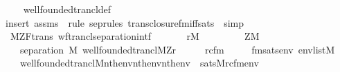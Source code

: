 \begin{isabellebody}
%
\isadelimproof
\ \ %
\endisadelimproof
%
\isatagproof
{}\isamarkupfalse%
\ \ wellfounded{\isacharunderscore}{\kern0pt}trancl{\isacharunderscore}{\kern0pt}def\isanewline
\ \ \isamarkupfalse%
\ {\isacharparenleft}{\kern0pt}insert\ assms\ {\isacharsemicolon}{\kern0pt}\ {\isacharparenleft}{\kern0pt}rule\ sep{\isacharunderscore}{\kern0pt}rules\ trans{\isacharunderscore}{\kern0pt}closure{\isacharunderscore}{\kern0pt}fm{\isacharunderscore}{\kern0pt}iff{\isacharunderscore}{\kern0pt}sats\ {\isacharbar}{\kern0pt}\ simp{\isacharparenright}{\kern0pt}{\isacharplus}{\kern0pt}{\isacharparenright}{\kern0pt}%
\endisatagproof
{\isafoldproof}%
%
\isadelimproof
\isanewline
%
\endisadelimproof
\isanewline
{}\isamarkupfalse%
\ {\isacharparenleft}{\kern0pt}\ M{\isacharunderscore}{\kern0pt}ZF{\isacharunderscore}{\kern0pt}trans{\isacharparenright}{\kern0pt}\ wftrancl{\isacharunderscore}{\kern0pt}separation{\isacharunderscore}{\kern0pt}intf{\isacharcolon}{\kern0pt}\isanewline
\ \ \isanewline
\ \ \ \ {\isachardoublequoteopen}r{\isasymin}M{\isachardoublequoteclose}\isanewline
\ \ \ \ \isanewline
\ \ \ \ {\isachardoublequoteopen}Z{\isasymin}M{\isachardoublequoteclose}\isanewline
\ \ \isanewline
\ \ \ \ {\isachardoublequoteopen}separation\ {\isacharparenleft}{\kern0pt}{\isacharhash}{\kern0pt}{\isacharhash}{\kern0pt}M{\isacharcomma}{\kern0pt}\ wellfounded{\isacharunderscore}{\kern0pt}trancl{\isacharparenleft}{\kern0pt}{\isacharhash}{\kern0pt}{\isacharhash}{\kern0pt}M{\isacharcomma}{\kern0pt}Z{\isacharcomma}{\kern0pt}r{\isacharparenright}{\kern0pt}{\isacharparenright}{\kern0pt}{\isachardoublequoteclose}\isanewline
%
\isadelimproof
%
\endisadelimproof
%
\isatagproof
{}\isamarkupfalse%
\ {\isacharminus}{\kern0pt}\isanewline
\ \ \isamarkupfalse%
\ rcfm\ \isanewline
\ \ \ \ fmsats{\isacharcolon}{\kern0pt}{\isachardoublequoteopen}{\isasymAnd}env{\isachardot}{\kern0pt}\ env{\isasymin}list{\isacharparenleft}{\kern0pt}M{\isacharparenright}{\kern0pt}\ {\isasymLongrightarrow}\isanewline
\ \ \ \ {\isacharparenleft}{\kern0pt}wellfounded{\isacharunderscore}{\kern0pt}trancl{\isacharparenleft}{\kern0pt}{\isacharhash}{\kern0pt}{\isacharhash}{\kern0pt}M{\isacharcomma}{\kern0pt}nth{\isacharparenleft}{\kern0pt}{}{\isacharcomma}{\kern0pt}env{\isacharparenright}{\kern0pt}{\isacharcomma}{\kern0pt}nth{\isacharparenleft}{\kern0pt}{}{\isacharcomma}{\kern0pt}env{\isacharparenright}{\kern0pt}{\isacharcomma}{\kern0pt}nth{\isacharparenleft}{\kern0pt}{}{\isacharcomma}{\kern0pt}env{\isacharparenright}{\kern0pt}{\isacharparenright}{\kern0pt}{\isacharparenright}{\kern0pt}\ {\isasymlongleftrightarrow}\ sats{\isacharparenleft}{\kern0pt}M{\isacharcomma}{\kern0pt}rcfm{\isacharparenleft}{\kern0pt}{}{\isacharcomma}{\kern0pt}{}{\isacharcomma}{\kern0pt}{}{\isacharparenright}{\kern0pt}{\isacharcomma}{\kern0pt}env{\isacharparenright}{\kern0pt}{\isachardoublequoteclose}\isanewline

\end{isabellebody}
